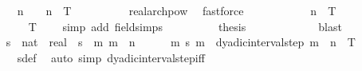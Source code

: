 \begin{isabellebody}
\ \ \ \ \ \ \isamarkupfalse%
\ n\ \ {\isachardoublequoteopen}{}\ {\isacharcircum}{\kern0pt}\ n\ {\isachargreater}{\kern0pt}\ {}{\isacharslash}{\kern0pt}T{\isachardoublequoteclose}\isanewline
\ \ \ \ \ \ \ \ \isamarkupfalse%
\ real{\isacharunderscore}{\kern0pt}arch{\isacharunderscore}{\kern0pt}pow\ \isamarkupfalse%
\ fastforce\isanewline
\ \ \ \ \ \ \isamarkupfalse%
\ \isamarkupfalse%
\ {\isachardoublequoteopen}{}\ {\isacharcircum}{\kern0pt}\ n\ {\isacharasterisk}{\kern0pt}\ T\ {\isasymge}\ {}{\isachardoublequoteclose}\isanewline
\ \ \ \ \ \ \ \ \isamarkupfalse%
\ {\isacartoucheopen}T\ {\isachargreater}{\kern0pt}\ {}{\isacartoucheclose}\ \isamarkupfalse%
\ {\isacharparenleft}{\kern0pt}simp\ add{\isacharcolon}{\kern0pt}\ field{\isacharunderscore}{\kern0pt}simps{\isacharparenright}{\kern0pt}\isanewline
\ \ \ \ \ \ \isamarkupfalse%
\ \isamarkupfalse%
\ {\isacharquery}{\kern0pt}thesis\isanewline
\ \ \ \ \ \ \ \ \isamarkupfalse%
\ {\isacharasterisk}{\kern0pt}\ \isamarkupfalse%
\ blast\isanewline
\ \ \ \ \isamarkupfalse%
\isanewline
\ \ \ \ \isamarkupfalse%
\ s\ {\isacharcolon}{\kern0pt}{\isacharcolon}{\kern0pt}\ {\isachardoublequoteopen}nat\ {\isasymRightarrow}\ real{\isachardoublequoteclose}\ \ {\isachardoublequoteopen}s\ {\isacharequal}{\kern0pt}\ {\isacharparenleft}{\kern0pt}{\isasymlambda}m{\isachardot}{\kern0pt}\ {}{\isacharslash}{\kern0pt}{}{\isacharcircum}{\kern0pt}{\isacharparenleft}{\kern0pt}m\ {\isacharplus}{\kern0pt}\ n{\isacharparenright}{\kern0pt}{\isacharparenright}{\kern0pt}{\isachardoublequoteclose}\isanewline
\ \ \ \ \isamarkupfalse%
\ {\isachardoublequoteopen}{\isasymforall}m{\isachardot}{\kern0pt}\ s\ m\ {\isasymin}\ dyadic{\isacharunderscore}{\kern0pt}interval{\isacharunderscore}{\kern0pt}step\ {\isacharparenleft}{\kern0pt}m\ {\isacharplus}{\kern0pt}\ n{\isacharparenright}{\kern0pt}\ {}\ T\ {\isacharminus}{\kern0pt}\ {\isacharbraceleft}{\kern0pt}{}{\isacharbraceright}{\kern0pt}{\isachardoublequoteclose}\isanewline
\ \ \ \ \ \ \isamarkupfalse%
\ s{\isacharunderscore}{\kern0pt}def\ \isamarkupfalse%
\ {\isacharparenleft}{\kern0pt}auto\ simp{\isacharcolon}{\kern0pt}\ dyadic{\isacharunderscore}{\kern0pt}interval{\isacharunderscore}{\kern0pt}step{\isacharunderscore}{\kern0pt}iff{\isacharparenright}{\kern0pt}\isanewline

\end{isabellebody}
